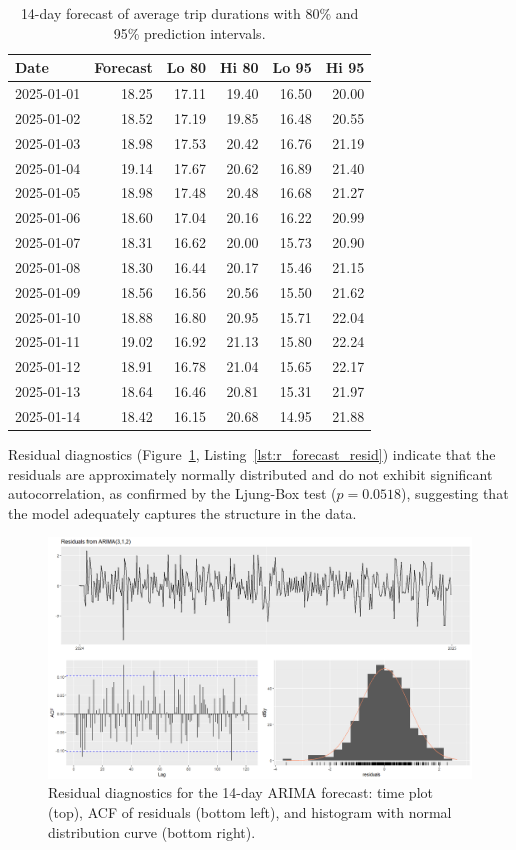 \documentclass{article}
\begin{document}
\begin{table}[ht]
\centering
\caption{14-day forecast of average trip durations with 80\% and 95\% prediction intervals.}
\label{tab:forecast_values}
\begin{tabular}{lrrrrr}
\toprule
Date & Forecast & Lo 80 & Hi 80 & Lo 95 & Hi 95 \\
\midrule
2025-01-01 & 18.25 & 17.11 & 19.40 & 16.50 & 20.00 \\
2025-01-02 & 18.52 & 17.19 & 19.85 & 16.48 & 20.55 \\
2025-01-03 & 18.98 & 17.53 & 20.42 & 16.76 & 21.19 \\
2025-01-04 & 19.14 & 17.67 & 20.62 & 16.89 & 21.40 \\
2025-01-05 & 18.98 & 17.48 & 20.48 & 16.68 & 21.27 \\
2025-01-06 & 18.60 & 17.04 & 20.16 & 16.22 & 20.99 \\
2025-01-07 & 18.31 & 16.62 & 20.00 & 15.73 & 20.90 \\
2025-01-08 & 18.30 & 16.44 & 20.17 & 15.46 & 21.15 \\
2025-01-09 & 18.56 & 16.56 & 20.56 & 15.50 & 21.62 \\
2025-01-10 & 18.88 & 16.80 & 20.95 & 15.71 & 22.04 \\
2025-01-11 & 19.02 & 16.92 & 21.13 & 15.80 & 22.24 \\
2025-01-12 & 18.91 & 16.78 & 21.04 & 15.65 & 22.17 \\
2025-01-13 & 18.64 & 16.46 & 20.81 & 15.31 & 21.97 \\
2025-01-14 & 18.42 & 16.15 & 20.68 & 14.95 & 21.88 \\
\bottomrule
\end{tabular}
\end{table}

Residual diagnostics (Figure~\ref{fig:forecast_diagnostics}, Listing~\ref{lst:r_forecast_resid}) indicate that the residuals are approximately normally distributed and do not exhibit significant autocorrelation, as confirmed by the Ljung-Box test ($p = 0.0518$), suggesting that the model adequately captures the structure in the data.

\begin{figure}
  \includegraphics[width=\textwidth]{finalproject/images/forecast-residuals.png}
  \caption{Residual diagnostics for the 14-day ARIMA forecast: time plot (top), ACF of residuals (bottom left), and histogram with normal distribution curve (bottom right). }
  \label{fig:forecast_diagnostics}
\end{figure}
\end{document}
